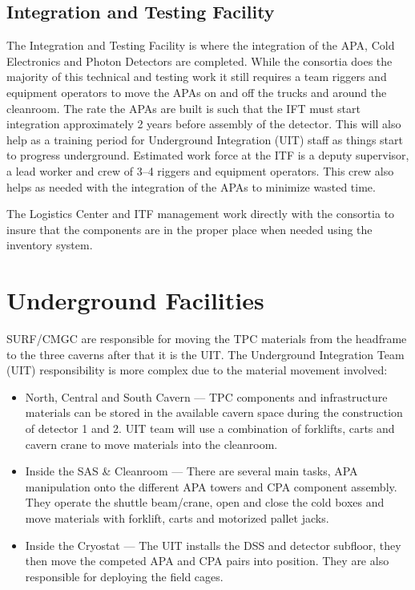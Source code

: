 \subsection{Integration and Testing Facility}

The Integration and Testing Facility is where the integration of the
APA, Cold Electronics and Photon Detectors are completed. While the
consortia does the majority of this technical and testing work it
still requires a team riggers and equipment operators to move the APAs
on and off the trucks and around the cleanroom.  The rate the APAs are
built is such that the IFT must start integration approximately 2
years before assembly of the detector.  This will also help as a
training period for Underground Integration (UIT) staff as things
start to progress underground.  Estimated work force at the ITF is a
deputy supervisor, a lead worker and crew of 3--4 riggers and equipment
operators.  This crew also helps as needed with the integration of the
APAs to minimize wasted time.

The Logistics Center and ITF management work directly with the
consortia to insure that the components are in the proper place when
needed using the inventory system.
  

\section{Underground Facilities}

SURF/CMGC are responsible for moving the TPC materials from the
headframe to the three caverns after that it is the UIT. The
Underground Integration Team (UIT) responsibility is more complex due
to the material movement involved:
\begin{itemize}
 \item North, Central and South Cavern --– TPC components and
   infrastructure materials can be stored in the available cavern
   space during the construction of detector 1 and 2.  UIT team will
   use a combination of forklifts, carts and cavern crane to move
   materials into the cleanroom.
 \item Inside the SAS \& Cleanroom --- There are several main tasks, APA
   manipulation onto the different APA towers and CPA component
   assembly.  They operate the shuttle beam/crane, open and close the
   cold boxes and move materials with forklift, carts and motorized
   pallet jacks.
 \item Inside the Cryostat --- The UIT installs the DSS and detector
   subfloor, they then move the competed APA and CPA pairs into
   position.  They are also responsible for deploying the field cages.
\end{itemize}

